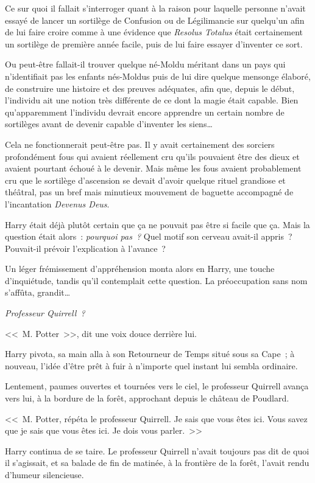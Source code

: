 Ce sur quoi il fallait s'interroger quant à la raison pour laquelle personne n'avait essayé de lancer un sortilège de Confusion ou de Légilimancie sur quelqu'un afin de lui faire croire comme à une évidence que \emph{Resolus Totalus} était certainement un sortilège de première année facile, puis de lui faire essayer d'inventer ce sort.

Ou peut-être fallait-il trouver quelque né-Moldu méritant dans un pays qui n'identifiait pas les enfants nés-Moldus puis de lui dire quelque mensonge élaboré, de construire une histoire et des preuves adéquates, afin que, depuis le début, l'individu ait une notion très différente de ce dont la magie était capable. Bien qu'apparemment l'individu devrait encore apprendre un certain nombre de sortilèges avant de devenir capable d'inventer les siens…

Cela ne fonctionnerait peut-être pas. Il y avait certainement des sorciers profondément fous qui avaient réellement cru qu'ils pouvaient être des dieux et avaient pourtant échoué à le devenir. Mais même les fous avaient probablement cru que le sortilège d'ascension se devait d'avoir quelque rituel grandiose et théâtral, pas un bref mais minutieux mouvement de baguette accompagné de l'incantation \emph{Devenus Deus}.

Harry était déjà plutôt certain que ça ne pouvait pas être si facile que ça. Mais la question était alors~: \emph{pourquoi pas~?} Quel motif son cerveau avait-il appris~? Pouvait-il prévoir l'explication à l'avance~?

Un léger frémissement d'appréhension monta alors en Harry, une touche d'inquiétude, tandis qu'il contemplait cette question. La préoccupation sans nom s'affûta, grandit…

\emph{Professeur Quirrell~?}

<<~M. Potter~>>, dit une voix douce derrière lui.

Harry pivota, sa main alla à son Retourneur de Temps situé sous sa Cape~; à nouveau, l'idée d'être prêt à fuir à n'importe quel instant lui sembla ordinaire.

Lentement, paumes ouvertes et tournées vers le ciel, le professeur Quirrell avança vers lui, à la bordure de la forêt, approchant depuis le château de Poudlard.

<<~M. Potter, répéta le professeur Quirrell. Je sais que vous êtes ici. Vous savez que je sais que vous êtes ici. Je dois vous parler.~>>

Harry continua de se taire. Le professeur Quirrell n'avait toujours pas dit de quoi il s'agissait, et sa balade de fin de matinée, à la frontière de la forêt, l'avait rendu d'humeur silencieuse.

